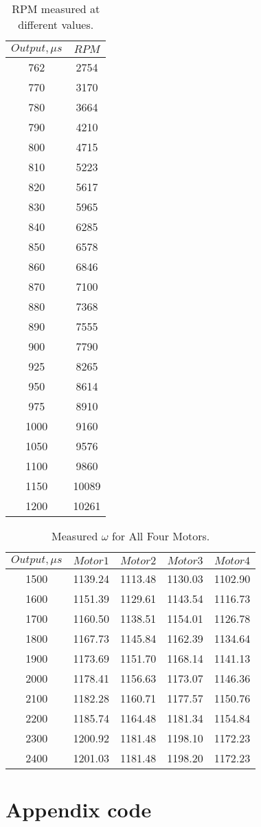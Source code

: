 \begin{table}[H]
\centering
\begin{tabular}{|c|c|}
\hline
$Output,\mu s$ 	& $RPM$ \\ \hline
762 			& 2754	\\ \hline
770				& 3170	\\ \hline
780				& 3664	\\ \hline
790				& 4210	\\ \hline
800 			& 4715  \\ \hline
810 			& 5223	\\ \hline
820 			& 5617  \\ \hline
830				& 5965 	\\ \hline
840				& 6285	\\ \hline
850 			& 6578	\\ \hline
860 			& 6846	\\ \hline
870 			& 7100	\\ \hline
880 			& 7368	\\ \hline
890 			& 7555	\\ \hline
900 			& 7790	\\ \hline
925 			& 8265	\\ \hline
950 			& 8614	\\ \hline
975 			& 8910	\\ \hline
1000 			& 9160	\\ \hline
1050 			& 9576	\\ \hline
1100 			& 9860	\\ \hline
1150 			& 10089	\\ \hline
1200			& 10261	\\ \hline
\end{tabular}
\caption{RPM measured at different values.}
\label{RPMTable}
\end{table}

\begin{table}[H]
\centering
\begin{tabular}{|c|c|c|c|c|}
\hline
$Output,\mu s$ 	& $Motor 1$	& $Motor 2$	& $Motor 3$	& $Motor 4$ \\ \hline
1500 			& 1139.24	& 1113.48	& 1130.03	& 1102.90	\\ \hline
1600			& 1151.39	& 1129.61	& 1143.54	& 1116.73	\\ \hline
1700			& 1160.50	& 1138.51	& 1154.01	& 1126.78	\\ \hline
1800			& 1167.73	& 1145.84	& 1162.39	& 1134.64	\\ \hline
1900 			& 1173.69	& 1151.70	& 1168.14	& 1141.13	\\ \hline
2000 			& 1178.41	& 1156.63	& 1173.07	& 1146.36	\\ \hline
2100 			& 1182.28	& 1160.71	& 1177.57	& 1150.76	\\ \hline
2200			& 1185.74	& 1164.48	& 1181.34	& 1154.84	\\ \hline
2300			& 1200.92	& 1181.48	& 1198.10	& 1172.23	\\ \hline
2400 			& 1201.03	& 1181.48	& 1198.20	& 1172.23	\\ \hline
\end{tabular}
\caption{Measured $\omega$ for All Four Motors.}
\label{speedTable}
\end{table}

\section{Appendix code}


\clearpage
